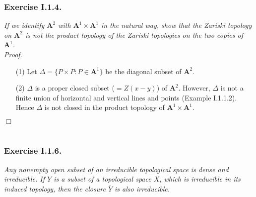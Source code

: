 \documentclass{article}
\begin{document}



\subsubsection*{Exercise I.1.4.}
\emph{If we identify $\mathbf{A}^2$ with $\mathbf{A}^1 \times \mathbf{A}^1$
in the natural way, show that the Zariski topology on $\mathbf{A}^2$
is not the product topology of the Zariski topologies on the two copies of $\mathbf{A}^1$.} \\



\emph{Proof.}
\begin{enumerate}
\item[(1)]
  Let $\Delta = \{ P \times P : P \in \mathbf{A}^1 \}$ be the diagonal subset of $\mathbf{A}^2$.

\item[(2)]
  $\Delta$ is a proper closed subset ($= Z(x-y)$) of $\mathbf{A}^2$.
  However, $\Delta$ is not a finite union of horizontal and vertical lines and points
  (Example I.1.1.2).
  Hence $\Delta$ is not closed in the product topology of $\mathbf{A}^1 \times \mathbf{A}^1$.
\end{enumerate}
$\Box$ \\\\






\subsubsection*{Exercise I.1.6.}
\emph{Any nonempty open subset of an irreducible topological space is dense and irreducible.
If $Y$ is a subset of a topological space $X$, which is irreducible in its induced topology,
then the closure $\overline{Y}$ is also irreducible.} \\
\end{document}
